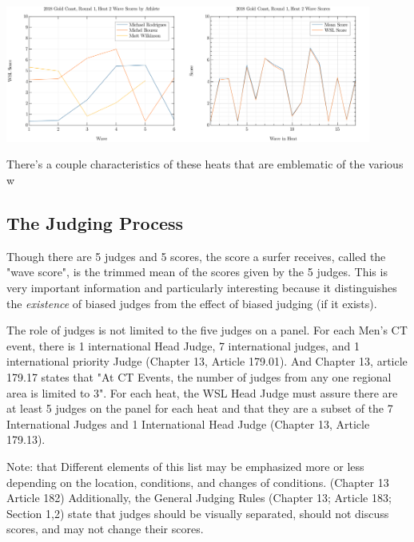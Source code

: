 \documentclass{article}
\theoremstyle{definition}
\begin{document}
\includegraphics[width=6cm]{./src/visuals/2018GCR1/WaveScoresByAthH2.png}\includegraphics[width=6cm]{./src/visuals/2018GCR1/WaveScoresH2.png}


There's a couple characteristics of these heats that are emblematic of the various w


\subsection{The Judging Process}
Though there are 5 judges and 5 scores, the score a surfer receives, called the "wave score", is the trimmed mean of the scores given by the 5 judges. This is very important information and particularly interesting because it distinguishes the \textit{existence} of biased judges from the effect of biased judging (if it exists).

The role of judges is not limited to the five judges on a panel. For each Men's CT event, there is 1 international Head Judge, 7 international judges, and 1 international priority Judge (Chapter 13, Article 179.01). And Chapter 13, article 179.17 states that "At CT Events, the number of judges from any one regional area is limited to 3". For each heat, the WSL Head Judge must assure there are at least 5 judges on the panel for each heat and that they are a subset of the 7 International Judges and 1 International Head Judge (Chapter 13, Article 179.13).

Note: that Different elements of this list may be emphasized more or less depending on the location, conditions, and changes of conditions. (Chapter 13 Article 182) Additionally, the General Judging Rules (Chapter 13; Article 183; Section 1,2) state that judges should be visually separated, should not discuss scores, and may not change their scores.
\end{document}
